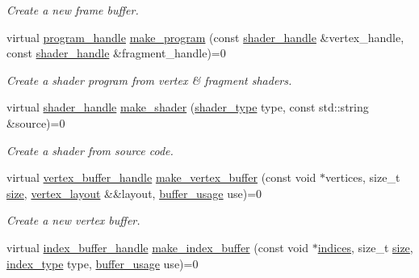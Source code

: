 \begin{DoxyCompactItemize}
\begin{DoxyCompactList}\small\item\em Create a new frame buffer. \end{DoxyCompactList}\item 
virtual \mbox{\hyperlink{structmoka_1_1program__handle}{program\+\_\+handle}} \mbox{\hyperlink{classmoka_1_1graphics__api_a8477dfbb8aad44e0828114c68fc21792}{make\+\_\+program}} (const \mbox{\hyperlink{structmoka_1_1shader__handle}{shader\+\_\+handle}} \&vertex\+\_\+handle, const \mbox{\hyperlink{structmoka_1_1shader__handle}{shader\+\_\+handle}} \&fragment\+\_\+handle)=0
\begin{DoxyCompactList}\small\item\em Create a shader program from vertex \& fragment shaders. \end{DoxyCompactList}\item 
virtual \mbox{\hyperlink{structmoka_1_1shader__handle}{shader\+\_\+handle}} \mbox{\hyperlink{classmoka_1_1graphics__api_ad1dd3ca0c1bd1477d2f40d3fae8b1956}{make\+\_\+shader}} (\mbox{\hyperlink{namespacemoka_a472008f32e5db526d38eace7d3e45772}{shader\+\_\+type}} type, const std\+::string \&source)=0
\begin{DoxyCompactList}\small\item\em Create a shader from source code. \end{DoxyCompactList}\item 
virtual \mbox{\hyperlink{structmoka_1_1vertex__buffer__handle}{vertex\+\_\+buffer\+\_\+handle}} \mbox{\hyperlink{classmoka_1_1graphics__api_af4d84630bb43f1573dbf6220b0c02677}{make\+\_\+vertex\+\_\+buffer}} (const void $\ast$vertices, size\+\_\+t \mbox{\hyperlink{namespacemoka_a4f125ee95d9889b23c3259d1fba4c2e4}{size}}, \mbox{\hyperlink{classmoka_1_1vertex__layout}{vertex\+\_\+layout}} \&\&layout, \mbox{\hyperlink{namespacemoka_a4799e695da8b173f75809387af8abed7}{buffer\+\_\+usage}} use)=0
\begin{DoxyCompactList}\small\item\em Create a new vertex buffer. \end{DoxyCompactList}\item 
virtual \mbox{\hyperlink{structmoka_1_1index__buffer__handle}{index\+\_\+buffer\+\_\+handle}} \mbox{\hyperlink{classmoka_1_1graphics__api_a7c7d927d38be3e441c91a5545b06c779}{make\+\_\+index\+\_\+buffer}} (const void $\ast$\mbox{\hyperlink{namespacemoka_a16a7bd7fc66f698dfcaf9bca1312a2bbaa51a528f35c02157e603a20c8796a684}{indices}}, size\+\_\+t \mbox{\hyperlink{namespacemoka_a4f125ee95d9889b23c3259d1fba4c2e4}{size}}, \mbox{\hyperlink{namespacemoka_a32244b0de63481283738e2db11639e3f}{index\+\_\+type}} type, \mbox{\hyperlink{namespacemoka_a4799e695da8b173f75809387af8abed7}{buffer\+\_\+usage}} use)=0

\end{DoxyCompactItemize}

